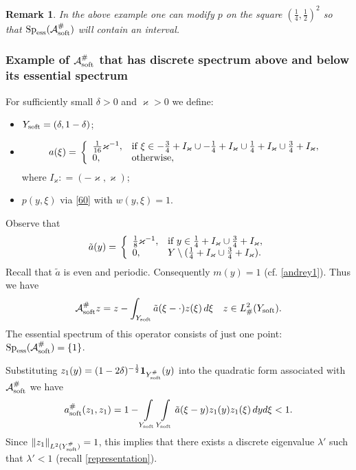 \documentclass[11pt]{article}
\newcommand\soft{{\rm soft}}
\def\AA{\mathcal{A}}
\DeclareMathOperator{\Sp}{Sp}
\newtheorem{remark}[theorem]{Remark}
\theoremstyle{remark}
\begin{document}
\begin{remark}
In the above example one can modify $p$ on the square $(\frac{1}{4},\frac{1}{2})^2$ so that    $\Sp_{\rm ess}(\AA_\soft^\# )$  will contain  an interval.
\end{remark} 	

	\subsubsection{Example of $\AA_\soft^\# $  that has   discrete spectrum above and below its essential spectrum}

\bigskip
For sufficiently small  $\delta>0$ and $\varkappa>0$ we define:
\begin{itemize}
	\item $Y_\soft =(\delta,1-\delta)$;
	\item \begin{equation}\label{68a}
			a(\xi)=\,\left\{\begin{array}{ll}
			\frac{1}{16}\varkappa^{-1}, & \hbox{if } \xi\in  -\frac34 + I_\varkappa
			\cup -\frac14 + I_\varkappa
			\cup \frac14 + I_\varkappa
			\cup \frac34 + I_\varkappa,  \\
			0, & \hbox{otherwise},
		\end{array}  \right.
	\end{equation}
	where $I_\varkappa: = (-\varkappa, \varkappa)$;
	\item $p(y,\xi)$ via \eqref{60} with $w(y,\xi)=1$.
\end{itemize} 	
Observe that
 $$
\tilde{a}(y)=\,\left\{\begin{array}{ll}
	\frac18\varkappa^{-1}, & \hbox{if } y\in \frac14 + I_\varkappa
	\cup \frac34 + I_\varkappa,  \\
	0, & Y\setminus (\frac14 + I_\varkappa
	\cup \frac34 + I_\varkappa).
\end{array}  \right.
$$
Recall that $\tilde{a}$ is even and periodic.
Consequently $m(y)=1$ (cf. \eqref{andrey1}). Thus we have
$$
\AA_\soft^\#  z= z-\int_{Y_\soft }\tilde{a}(\xi-\cdot) z(\xi)\,d\xi \quad  z \in L^2_\#(Y_\soft).
$$
The essential spectrum of this operator consists of just one point: $\Sp _{\rm ess}(\AA_\soft^\# )=\{1\}$.

Substituting $z_1(y)=(1- 2\delta)^{-\frac12} \mathbf{1}_{Y^\#_\soft}(y)$ into the quadratic form associated with  $\AA_\soft^\#$ we have
$$
a_\soft^\#(z_1,z_1) =1-\int\limits_{Y_\soft }\int\limits_{Y_\soft } \tilde{a}(\xi-y) z_1(y)z_1(\xi)\, dyd\xi<1.
$$
Since $\|z_1\|_{L^2(Y^\#_\soft)}=1$, this implies that there exists a discrete eigenvalue $\lambda'$ such that $\lambda'<1$ (recall \eqref{representation}).
\end{document}
